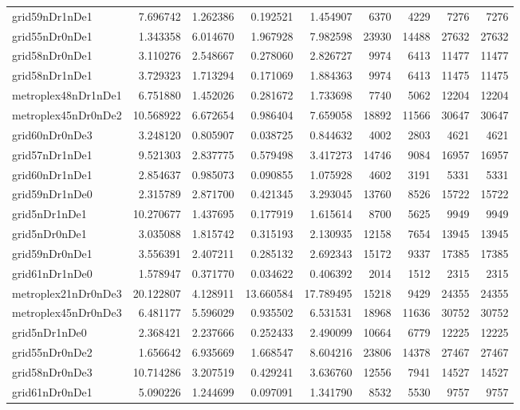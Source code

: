 \begin{longtable}{|l|r|r|r|r|r|r|r|r|}
grid59nDr1nDe1 & 7.696742 & 1.262386 & 0.192521 & 1.454907 & 6370 & 4229 & 7276 & 7276 \\
grid55nDr0nDe1 & 1.343358 & 6.014670 & 1.967928 & 7.982598 & 23930 & 14488 & 27632 & 27632 \\
grid58nDr0nDe1 & 3.110276 & 2.548667 & 0.278060 & 2.826727 & 9974 & 6413 & 11477 & 11477 \\
grid58nDr1nDe1 & 3.729323 & 1.713294 & 0.171069 & 1.884363 & 9974 & 6413 & 11475 & 11475 \\
metroplex48nDr1nDe1 & 6.751880 & 1.452026 & 0.281672 & 1.733698 & 7740 & 5062 & 12204 & 12204 \\
metroplex45nDr0nDe2 & 10.568922 & 6.672654 & 0.986404 & 7.659058 & 18892 & 11566 & 30647 & 30647 \\
grid60nDr0nDe3 & 3.248120 & 0.805907 & 0.038725 & 0.844632 & 4002 & 2803 & 4621 & 4621 \\
grid57nDr1nDe1 & 9.521303 & 2.837775 & 0.579498 & 3.417273 & 14746 & 9084 & 16957 & 16957 \\
grid60nDr1nDe1 & 2.854637 & 0.985073 & 0.090855 & 1.075928 & 4602 & 3191 & 5331 & 5331 \\
grid59nDr1nDe0 & 2.315789 & 2.871700 & 0.421345 & 3.293045 & 13760 & 8526 & 15722 & 15722 \\
grid5nDr1nDe1 & 10.270677 & 1.437695 & 0.177919 & 1.615614 & 8700 & 5625 & 9949 & 9949 \\
grid5nDr0nDe1 & 3.035088 & 1.815742 & 0.315193 & 2.130935 & 12158 & 7654 & 13945 & 13945 \\
grid59nDr0nDe1 & 3.556391 & 2.407211 & 0.285132 & 2.692343 & 15172 & 9337 & 17385 & 17385 \\
grid61nDr1nDe0 & 1.578947 & 0.371770 & 0.034622 & 0.406392 & 2014 & 1512 & 2315 & 2315 \\
metroplex21nDr0nDe3 & 20.122807 & 4.128911 & 13.660584 & 17.789495 & 15218 & 9429 & 24355 & 24355 \\
metroplex45nDr0nDe3 & 6.481177 & 5.596029 & 0.935502 & 6.531531 & 18968 & 11636 & 30752 & 30752 \\
grid5nDr1nDe0 & 2.368421 & 2.237666 & 0.252433 & 2.490099 & 10664 & 6779 & 12225 & 12225 \\
grid55nDr0nDe2 & 1.656642 & 6.935669 & 1.668547 & 8.604216 & 23806 & 14378 & 27467 & 27467 \\
grid58nDr0nDe3 & 10.714286 & 3.207519 & 0.429241 & 3.636760 & 12556 & 7941 & 14527 & 14527 \\
grid61nDr0nDe1 & 5.090226 & 1.244699 & 0.097091 & 1.341790 & 8532 & 5530 & 9757 & 9757 \\

\end{longtable}
